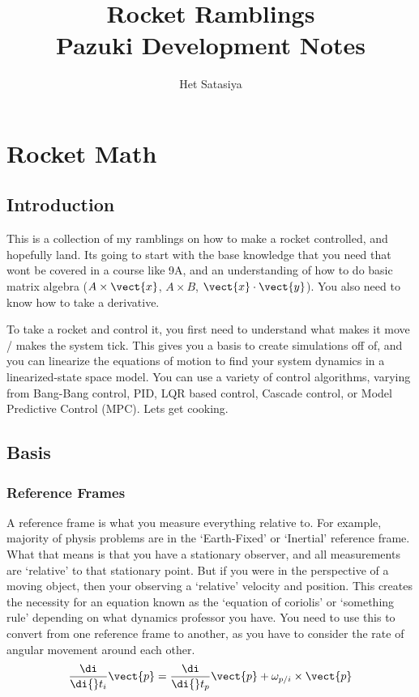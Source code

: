 \documentclass{report}
\title{%
Rocket Ramblings \\
\large Pazuki Development Notes}
\author{Het Satasiya}
\newcommand{\diff}[1]{\frac{\di}{\di{}t_{#1}}}
\begin{document}
\maketitle

\pagebreak
\chapter{Rocket Math}
\section{Introduction}
This is a collection of my ramblings on how to make a rocket controlled, and hopefully land. Its going to start with the base knowledge that you need that wont be covered in a course like 9A, and an understanding of how to do basic matrix algebra ($A \times \vect{x}$, $A \times B$, $\vect{x} \cdot \vect{y}$). You also need to know how to take a derivative.

To take a rocket and control it, you first need to understand what makes it move / makes the system tick. This gives you a basis to create simulations off of, and you can linearize the equations of motion to find your system dynamics in a linearized{-}state space model. You can use a variety of control algorithms, varying from Bang{-}Bang control, PID, LQR based control, Cascade control, or Model Predictive Control (MPC). Lets get cooking.

\section{Basis}

\subsection{Reference Frames}
A reference frame is what you measure everything relative to. For example, majority of physis problems are in the `Earth-Fixed' or `Inertial' reference frame. What that means is that you have a stationary observer, and all measurements are `relative' to that stationary point. But if you were in the perspective of a moving object, then your observing a `relative' velocity and position. This creates the necessity for an equation known as the `equation of coriolis' or `something rule' depending on what dynamics professor you have. You need to use this to convert from one reference frame to another, as you have to consider the rate of angular movement around each other.  
\begin{equation} \label{eq:1} 
    \diff{i} \vect{p} =  \diff{p}\vect{p} + \omega_{p/i} \times \vect{p}
\end{equation}
\end{document}

